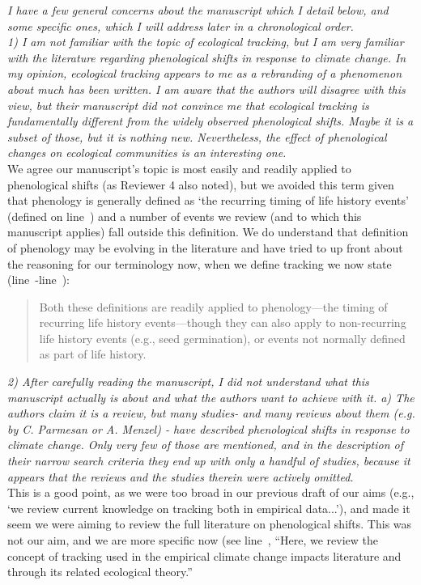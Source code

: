 \documentclass[11pt]{article}
\newcommand{\lr}[1]{line~\lineref{#1}}
\begin{document}
\emph{I have a few general concerns about the manuscript which I detail below, and some specific
ones, which I will address later in a chronological order.\\
1) I am not familiar with the topic of ecological tracking, but I am very familiar with the
literature regarding phenological shifts in response to climate change. In my opinion,
ecological tracking appears to me as a rebranding of a phenomenon about much has been
written. I am aware that the authors will disagree with this view, but their manuscript did
not convince me that ecological tracking is fundamentally different from the widely observed
phenological shifts. Maybe it is a subset of those, but it is nothing new. Nevertheless, the
effect of phenological changes on ecological communities is an interesting one.
}\\
\clearpage
We agree our manuscript's topic is most easily and readily applied to phenological shifts (as Reviewer 4 also noted), but we avoided this term given that phenology is generally defined as `the recurring timing of life history events' (defined on \lr{phendefine1}) and a number of events we review (and to which this manuscript applies) fall outside this definition. We do understand that definition of phenology may be evolving in the literature and have tried to up front about the reasoning for our terminology now, when we define tracking we now state (\lr{phendefineS}-\lr{phendefineE}):  
\begin{quote}
Both these definitions are readily applied to phenology---the timing of recurring life history events---though they can also apply to non-recurring life history events (e.g., seed germination), or events not normally defined as part of life history.
\end{quote}


\emph{2) After carefully reading the manuscript, I did not understand what this manuscript actually
is about and what the authors want to achieve with it.
a) The authors claim it is a review, but many studies- and many reviews about them (e.g. by
C. Parmesan or A. Menzel) - have described phenological shifts in response to climate change.
Only very few of those are mentioned, and in the description of their narrow search criteria
they end up with only a handful of studies, because it appears that the reviews and the
studies therein were actively omitted.}\\

This is a good point, as we were too broad in our previous draft of our aims (e.g., `we review current knowledge on tracking both in empirical data...'), and made it seem we were aiming to review the full literature on phenological shifts. This was not our aim, and we are more specific now (see \lr{aimS}, ``Here, we review the concept of tracking used in the empirical climate change impacts literature and through its related ecological theory.''\\
\end{document}
